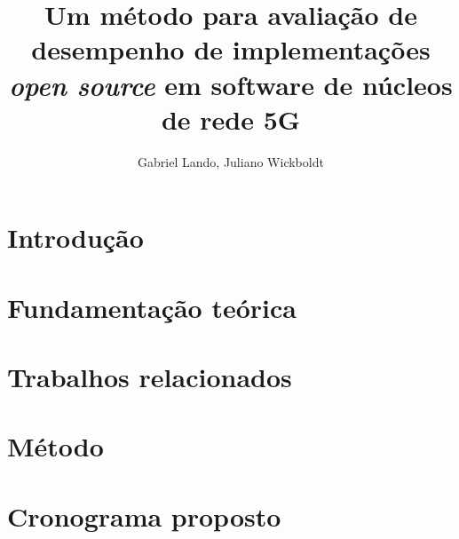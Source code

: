 \documentclass[12pt]{article}
\title{Um método para avaliação de desempenho de implementações \\
\textit{open source} em software de núcleos de rede 5G}
\author{Gabriel Lando\inst{1}, Juliano Wickboldt\inst{1}}
\begin{document}
 

\maketitle

\begin{abstract}

\end{abstract}
     
\begin{resumo} 

\end{resumo}

\section{Introdução}
\label{sec:intro}


\section{Fundamentação teórica}
\label{sec:background}


\section{Trabalhos relacionados}
\label{sec:related}


\section{Método}
\label{sec:method}


\section{Cronograma proposto}
\label{sec:schedule}





\end{document}
